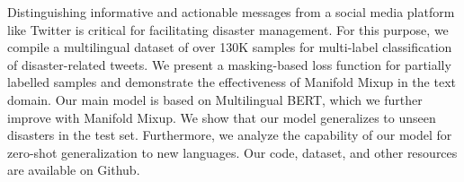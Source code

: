 Distinguishing informative and actionable messages from a social media platform like Twitter is critical for facilitating disaster management. For this purpose, we compile a multilingual dataset of over 130K samples for multi-label classification of disaster-related tweets. We present a masking-based loss function for partially labelled samples and demonstrate the effectiveness of Manifold Mixup in the text domain. Our main model is based on Multilingual BERT, which we further improve with Manifold Mixup. We show that our model generalizes to unseen disasters in the test set. Furthermore, we analyze the capability of our model for zero-shot generalization to new languages.  Our code, dataset, and other resources are available on Github.
